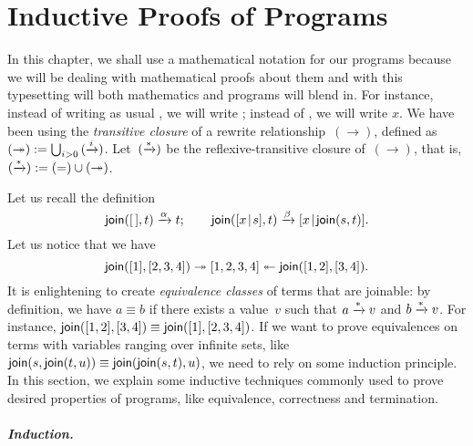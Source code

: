 \chapter{Inductive Proofs of Programs}

In this chapter, we shall use a mathematical notation for our programs
because we will be dealing with mathematical proofs about them and
with this typesetting will both mathematics and programs will blend
in. For instance, instead of writing as usual , we will
write ; instead of , we will write \(x\). We have
been using the \emph{transitive closure} of a rewrite
relationship~\((\rightarrow)\), defined as \((\twoheadrightarrow) :=
\bigcup_{i >
  0}{(\xrightarrow{\smash{i}})}\). Let~\((\xrightarrow{\smash{*}})\) be
the reflexive\hyp{}transitive closure of~\((\rightarrow)\), that is,
\((\xrightarrow{\smash{*}}) := (=) \cup (\twoheadrightarrow)\).

Let us recall the definition
\begin{equation*}
\textsf{join}(        [\,],t) \xrightarrow{\smash{\alpha}} t;\qquad
\textsf{join}([{x}\!\mid\!{s}],t) \xrightarrow{\smash{\beta}} [{x}\!\mid\!{\textsf{join}(s,t)}].
\end{equation*}
Let us notice that we have
\[
\textsf{join}([1], [2,3,4]) \twoheadrightarrow [1,2,3,4] 
\twoheadleftarrow \textsf{join}([1,2], [3,4]).
\]
It is enlightening to create \emph{equivalence classes} of terms that
are joinable: by definition, we have \(a \equiv b\) if there exists a
value~\(v\) such that \(a \xrightarrow{\smash{*}} v\) and \(b
\xrightarrow{\smash{*}} v\). For instance, \(\textsf{join}([1,2], [3,4])
\equiv \textsf{join}([1], [2,3,4])\). If we want to prove equivalences on
terms with variables ranging over infinite sets, like
\(\textsf{join}(s,\textsf{join}(t,u)) \equiv
\textsf{join}(\textsf{join}(s,t),u)\), we need to rely on some induction
principle. In this section, we explain some inductive techniques
commonly used to prove desired properties of programs, like
equivalence, correctness and termination.

\medskip

\paragraph{Induction.}

